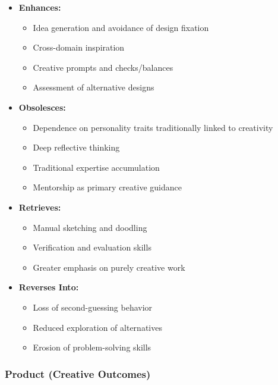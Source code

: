 \begin{itemize}
    \item \textbf{Enhances:}
          \begin{itemize}
              \item Idea generation and avoidance of design fixation
              \item Cross-domain inspiration
              \item Creative prompts and checks/balances
              \item Assessment of alternative designs
          \end{itemize}

    \item \textbf{Obsolesces:}
          \begin{itemize}
              \item Dependence on personality traits traditionally linked to creativity
              \item Deep reflective thinking
              \item Traditional expertise accumulation
              \item Mentorship as primary creative guidance
          \end{itemize}

    \item \textbf{Retrieves:}
          \begin{itemize}
              \item Manual sketching and doodling
              \item Verification and evaluation skills
              \item Greater emphasis on purely creative work
          \end{itemize}

    \item \textbf{Reverses Into:}
          \begin{itemize}
              \item Loss of second-guessing behavior
              \item Reduced exploration of alternatives
              \item Erosion of problem-solving skills
          \end{itemize}
\end{itemize}
\subsubsection{Product (Creative Outcomes)}

